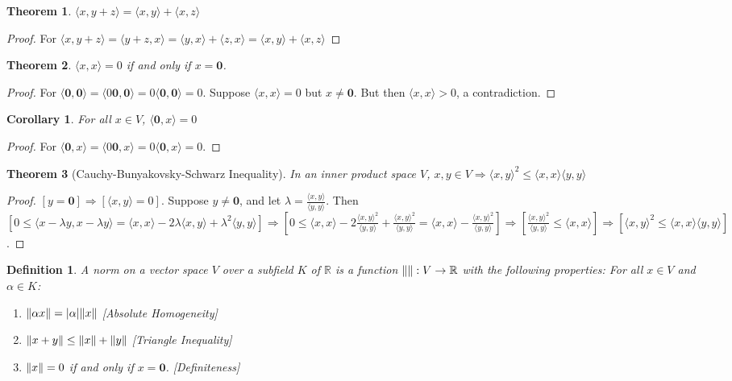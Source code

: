 \documentclass[crop=false,class=book]{standalone}
\theoremstyle{mystyle}
\newtheorem{theorem}{Theorem}[section]
\newtheorem{definition}{Definition}[section]
\newtheorem{corollary}{Corollary}[section]
\DeclarePairedDelimiter\norm{\lVert}{\rVert}
\begin{document}
\begin{theorem}
$\langle x,y+z\rangle=\langle x,y\rangle+\langle x,z\rangle$
\end{theorem}
\begin{proof}
For $\langle x,y+z\rangle=\langle y+z,x\rangle=\langle y,x\rangle+\langle z,x\rangle=\langle x,y\rangle+\langle x,z\rangle$
\end{proof}
\begin{theorem}
$\langle x,x \rangle = 0$ if and only if $x= \mathbf{0}$.
\end{theorem}
\begin{proof}
For $\langle \mathbf{0}, \mathbf{0} \rangle = \langle 0\mathbf{0},\mathbf{0} \rangle = 0 \langle \mathbf{0},\mathbf{0}\rangle = 0$. Suppose $\langle x,x \rangle =0$ but $x\ne \mathbf{0}$. But then $\langle x,x \rangle >0$, a contradiction.
\end{proof}
\begin{corollary}
For all $x\in V$, $\langle \mathbf{0},x \rangle = 0$
\end{corollary}
\begin{proof}
For $\langle \mathbf{0}, x\rangle = \langle 0\mathbf{0},x \rangle = 0\langle \mathbf{0},x\rangle = 0$.
\end{proof}
\begin{theorem}[Cauchy-Bunyakovsky-Schwarz Inequality]
In an inner product space $V$, $x,y\in V\Rightarrow \langle x,y \rangle^2 \leq \langle x,x \rangle \langle y,y \rangle$
\end{theorem}
\begin{proof}
$[y=\mathbf{0}]\Rightarrow [\langle x,y\rangle = 0]$. Suppose $y\ne \mathbf{0}$, and let $\lambda = \frac{\langle x,y \rangle}{\langle y,y \rangle}$. Then $[0 \leq \langle x-\lambda y, x-\lambda y\rangle = \langle x,x \rangle - 2\lambda \langle x,y \rangle + \lambda^2 \langle y,y \rangle]\Rightarrow [0\leq \langle x,x \rangle - 2\frac{\langle x,y \rangle ^2 }{\langle y,y \rangle} + \frac{\langle x,y \rangle^2}{\langle y,y \rangle} = \langle x,x \rangle - \frac{\langle x,y \rangle^2}{\langle y,y \rangle}]\Rightarrow [\frac{\langle x,y \rangle ^2}{\langle y,y \rangle} \leq \langle x,x \rangle]\Rightarrow [\langle x,y \rangle^2 \leq \langle x,x \rangle \langle y,y \rangle]$.
\end{proof}
\begin{definition}
A norm on a vector space $V$ over a subfield $K$ of $\mathbb{R}$ is a function $\norm{}:V\rightarrow \mathbb{R}$ with the following properties: For all $x \in V$ and $\alpha \in K$:
\begin{enumerate}
\item $\norm{\alpha x} = |\alpha| \norm{x}$ \hfill [Absolute Homogeneity]
\item $\norm{x+y} \leq \norm{x}+\norm{y}$ \hfill [Triangle Inequality]
\item $\norm{x} = 0$ if and only if $x = \mathbf{0}$. \hfill [Definiteness]
\end{enumerate}
\end{definition}
\end{document}
